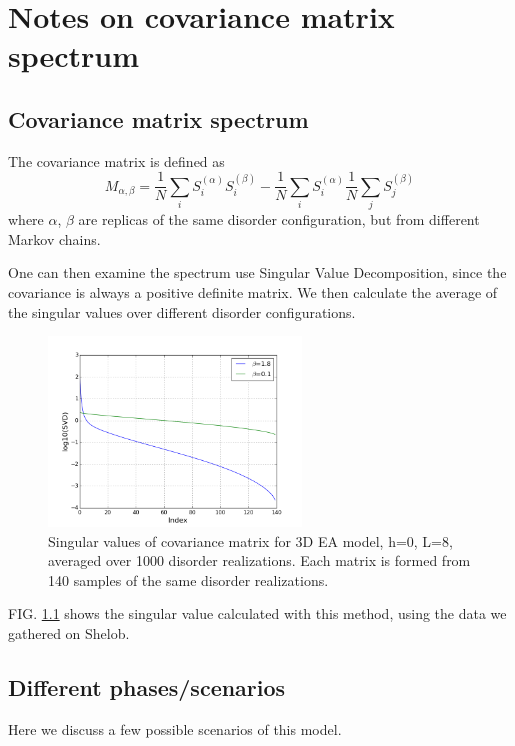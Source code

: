 \chapter{Notes on covariance matrix spectrum}
\section{Covariance matrix spectrum}
The covariance matrix is defined as 
\[
M_{\alpha,\beta}=\frac{1}{N}\sum_iS_i^{(\alpha)}S_i^{(\beta)}-
\frac{1}{N}\sum_iS_i^{(\alpha)}\frac{1}{N}\sum_jS_j^{(\beta)}
\]
where $\alpha$, $\beta$ are replicas of the same disorder configuration, 
but from different Markov chains.

One can then examine the spectrum use Singular Value Decomposition, since
the covariance is always a positive definite matrix. 
We then calculate the average of the singular values over different disorder 
configurations. 

\begin{figure}[ht]
  \centering
  \includegraphics[width=0.6\textwidth]{img/matrix/svd_data.png}
  \caption{Singular values of covariance matrix for 3D EA model, h=0, L=8, 
averaged over 1000 disorder realizations. 
Each matrix is formed from 140 samples of the same disorder realizations.}
  \label{fig:exp}
\end{figure}

FIG. \ref{fig:exp} shows the singular value calculated with this method, using
the data we gathered on Shelob.

\section{Different phases/scenarios}
Here we discuss a few possible scenarios of this model.

